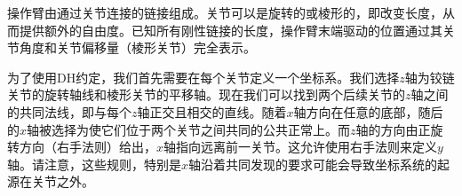 操作臂由通过关节连接的链接组成。关节可以是旋转的或棱形的，即改变长度，从而提供额外的自由度。已知所有刚性链接的长度，操作臂末端驱动的位置通过其关节角度和关节偏移量（棱形关节）完全表示。



为了使用DH约定，我们首先需要在每个关节定义一个坐标系。我们选择$z$轴为铰链关节的旋转轴线和棱形关节的平移轴。现在我们可以找到两个后续关节的$z$轴之间的共同法线，即与每个$z$轴正交且相交的直线。随着$x$轴方向在任意的底部，随后的$x$轴被选择为使它们位于两个关节之间共同的公共正常上。而$z$轴的方向由正旋转方向（右手法则）给出，$x$轴指向远离前一关节。这允许使用右手法则来定义$y$轴。请注意，这些规则，特别是$x$轴沿着共同发现的要求可能会导致坐标系统的起源在关节之外。


